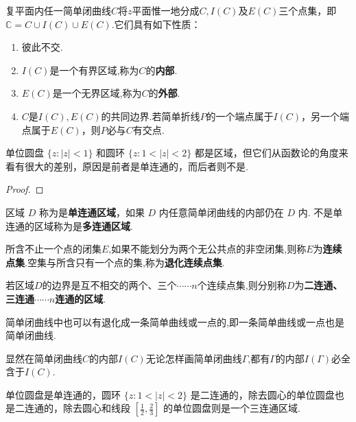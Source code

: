 \documentclass[../../main.tex]{subfiles}%
\begin{document}
\begin{theorem}[Jordan定理]\label{theorem:Jordan定理}
复平面内任一简单闭曲线$C$将$z$平面惟一地分成$C,I(C)$及$E(C)$三个点集，即$\mathbb{C}=C\cup I(C)\cup E(C)$.它们具有如下性质：
\begin{enumerate}[(1)]
\item 彼此不交.

\item $I(C)$是一个有界区域,称为$C$的\textbf{内部}.

\item $E(C)$是一个无界区域,称为$C$的\textbf{外部}.

\item $C$是$I(C),E(C)$的共同边界.若简单折线$P$的一个端点属于$I(C)$，另一个端点属于$E(C)$，则$P$必与$C$有交点.
\end{enumerate}
\end{theorem}
\begin{note}
单位圆盘 $\{ z: \vert z \vert < 1\}$ 和圆环 $\{ z: 1 < \vert z \vert < 2\}$ 都是区域，但它们从函数论的角度来看有很大的差别，原因是前者是单连通的，而后者则不是.
\end{note}
\begin{proof}



\end{proof}

\begin{definition}
区域 $D$ 称为是\textbf{单连通区域}，如果 $D$ 内任意简单闭曲线的内部仍在 $D$ 内. 不是单连通的区域称为是\textbf{多连通区域}.

所含不止一个点的闭集$E$,如果不能划分为两个无公共点的非空闭集,则称$E$为\textbf{连续点集}.空集与所含只有一个点的集,称为\textbf{退化连续点集}.

若区域$D$的边界是互不相交的两个、三个$\cdots\cdots n$个连续点集,则分别称$D$为\textbf{二连通、三连通}$\cdots\cdots n$\textbf{连通的区域}.
\end{definition}
\begin{remark}
简单闭曲线中也可以有退化成一条简单曲线或一点的,即一条简单曲线或一点也是简单闭曲线.
\end{remark}
\begin{note}
显然在简单闭曲线$C$的内部$I(C)$无论怎样画简单闭曲线$\varGamma$,都有$\varGamma$的内部$I(\varGamma)$必全含于$I(C)$.
\end{note}

\begin{example}
单位圆盘是单连通的，圆环 $\{ z: 1 < \vert z \vert < 2\}$ 是二连通的，除去圆心的单位圆盘也是二连通的，除去圆心和线段 $\left[ \frac{1}{2}, \frac{2}{3} \right]$ 的单位圆盘则是一个三连通区域.
\end{example}
\end{document}
